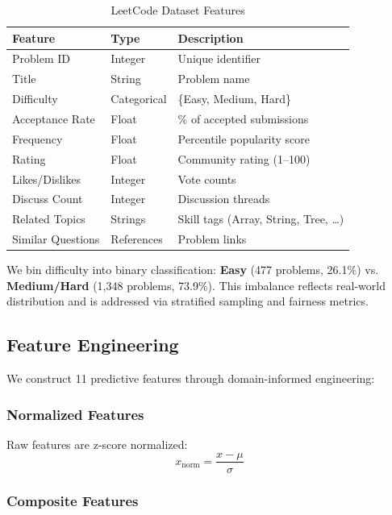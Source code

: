\documentclass[conference]{IEEEtran}
\begin{document}
\begin{table}[h]
\centering
\small
\begin{tabular}{l|l|l}
\toprule
\textbf{Feature} & \textbf{Type} & \textbf{Description} \\
\midrule
Problem ID & Integer & Unique identifier \\
Title & String & Problem name \\
Difficulty & Categorical & \{Easy, Medium, Hard\} \\
Acceptance Rate & Float & \% of accepted submissions \\
Frequency & Float & Percentile popularity score \\
Rating & Float & Community rating (1--100) \\
Likes/Dislikes & Integer & Vote counts \\
Discuss Count & Integer & Discussion threads \\
Related Topics & Strings & Skill tags (Array, String, Tree, \ldots) \\
Similar Questions & References & Problem links \\
\bottomrule
\end{tabular}
\caption{LeetCode Dataset Features}
\label{tab:dataset}
\end{table}

We bin difficulty into binary classification: \textbf{Easy} (477 problems, 26.1\%) vs. \textbf{Medium/Hard} (1,348 problems, 73.9\%). This imbalance reflects real-world distribution and is addressed via stratified sampling and fairness metrics.

\subsection{Feature Engineering}

We construct 11 predictive features through domain-informed engineering:

\subsubsection{Normalized Features}
Raw features are z-score normalized:
\begin{equation}
x_{\text{norm}} = \frac{x - \mu}{\sigma}
\end{equation}

\subsubsection{Composite Features}
\end{document}
